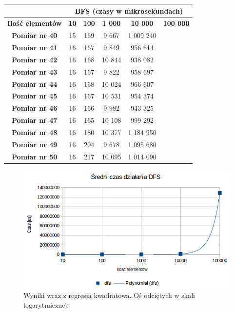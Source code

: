 \documentclass[11pt,a4paper]{article}
\begin{document}
\begin{center}
\begin{tabular}{|c|c|c|c|c|c|}
\hline
\textbf{} & \multicolumn{ 5}{c|}{\textbf{BFS (czasy w mikrosekundach)}} \\ \hline
\textbf{Ilość elementów} & \textbf{10} & \textbf{100} & \textbf{1 000} & \textbf{10 000} & \textbf{100 000} \\ \hline
\textbf{Pomiar nr 40} & 15 & 169 & 9 667 & 1 009 240 &  \\ \hline
\textbf{Pomiar nr 41} & 16 & 167 & 9 849 & 956 614 &  \\ \hline
\textbf{Pomiar nr 42} & 16 & 168 & 10 844 & 938 082 &  \\ \hline
\textbf{Pomiar nr 43} & 16 & 167 & 9 822 & 958 697 &  \\ \hline
\textbf{Pomiar nr 44} & 16 & 168 & 10 024 & 966 607 &  \\ \hline
\textbf{Pomiar nr 45} & 16 & 167 & 10 531 & 954 374 &  \\ \hline
\textbf{Pomiar nr 46} & 16 & 166 & 9 982 & 943 325 &  \\ \hline
\textbf{Pomiar nr 47} & 16 & 165 & 10 108 & 999 292 &  \\ \hline
\textbf{Pomiar nr 48} & 16 & 180 & 10 377 & 1 184 950 &  \\ \hline
\textbf{Pomiar nr 49} & 16 & 204 & 9 678 & 1 095 680 &  \\ \hline
\textbf{Pomiar nr 50} & 16 & 217 & 10 095 & 1 014 090 &  \\ \hline
\end{tabular}
\label{bfs2}
\end{center}




\begin{figure}[htbp]
\begin{center}
	\includegraphics[scale=0.7]{../wyniki/DFS.png}
\end{center}
\caption{Wyniki wraz z regresją kwadratową. Oś odciętych w skali logarytmicznej.}
\end{figure}
\end{document}
